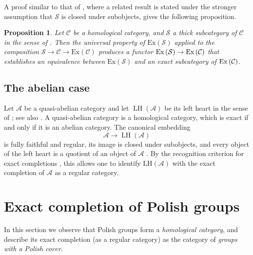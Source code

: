 \documentclass[12pt]{amsart}
\newtheorem{proposition}[theorem]{Proposition}
\theoremstyle{definition}
\newcommand{\func}[1]{\operatorname{#1}}
\begin{document}
A proof similar to that of \cite[Proposition 2.2]%
{gran_semi-localizations_2016}, where a related result is stated under the
stronger assumption that $\mathcal{S}$ is closed under subobjects, gives the
following proposition.

\begin{proposition}
\label{Proposition:completion-thick} Let $\mathcal{C}$ be a homological
category, and $\mathcal{S}$ a thick subcategory of $\mathcal{C}$ in the
sense of . Then the universal property of $\mathrm{Ex}%
\left( \mathcal{S}\right) $ applied to the composition $\mathcal{S}%
\rightarrow \mathcal{C}\rightarrow \mathrm{Ex}\left( \mathcal{C}\right) $
produces a functor $\mathrm{Ex}\left( \mathcal{S}\right) \rightarrow \mathrm{%
Ex}\left( \mathcal{C}\right) $ that establishes an equivalence between $%
\mathrm{Ex}\left( \mathcal{S}\right) $ and an exact subcategory of $\mathrm{%
Ex}\left( \mathcal{C}\right) $.
\end{proposition}

\subsection{The abelian case}

\label{sec:abelian-case}

Let $\mathcal{A}$ be a quasi-abelian category and let $\func{LH}(\mathcal{A}%
) $ be its left heart in the sense of \cite{schneiders_quasi-abelian_1999};
see also \cite{henrard_left_2022}. A quasi-abelian category is a homological
category, which is exact if and only if it is an abelian category. The
canonical embedding 
\begin{equation*}
\mathcal{A}\longrightarrow \func{LH}(\mathcal{A})
\end{equation*}%
is fully faithful and regular, its image is closed under subobjects, and
every object of the left heart is a quotient of an object of $\mathcal{A}$ 
\cite[Theorem~1.3]{henrard_left_2022}. By the recognition criterion for
exact completions \cite{carboni_regular_1998}, this allows one to identify $%
\mathrm{LH}\left( \mathcal{A}\right) $ with the exact completion of $%
\mathcal{A}$ as a regular category.

\section{Exact completion of Polish groups\label{Section:completion}}

In this section we observe that Polish groups form a \emph{homological
category}, and describe its exact completion (as a regular category) as the
category of \emph{groups with a Polish cover}.
\end{document}
